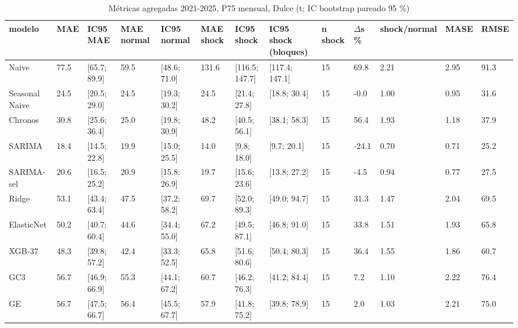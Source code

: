 \begin{table}[H]
\centering
\small
\caption{Métricas agregadas 2021-2025, P75 mensual, Dulce (t; IC bootstrap pareado 95 \%)}
\label{tab:T06_agregadas_P75_principal_2021_2025_dulce}
\begin{tabular}{lllllllllllll}
\toprule
modelo & MAE & IC95 MAE & MAE normal & IC95 normal & MAE shock & IC95 shock & IC95 shock (bloques) & n shock & $\Delta$s \% & shock/normal & MASE & RMSE \\
\midrule
Naive & 77.5 & [65.7; 89.9] & 59.5 & [48.6; 71.0] & 131.6 & [116.5; 147.7] & [117.4; 147.1] & 15 & 69.8 & 2.21 & 2.95 & 91.3 \\
Seasonal Naive & 24.5 & [20.5; 29.0] & 24.5 & [19.3; 30.2] & 24.5 & [21.4; 27.8] & [18.8; 30.4] & 15 & -0.0 & 1.00 & 0.95 & 31.6 \\
Chronos & 30.8 & [25.6; 36.4] & 25.0 & [19.8; 30.9] & 48.2 & [40.5; 56.1] & [38.1; 58.3] & 15 & 56.4 & 1.93 & 1.18 & 37.9 \\
SARIMA & 18.4 & [14.5; 22.8] & 19.9 & [15.0; 25.5] & 14.0 & [9.8; 18.0] & [9.7; 20.1] & 15 & -24.1 & 0.70 & 0.71 & 25.2 \\
SARIMA-sel & 20.6 & [16.5; 25.2] & 20.9 & [15.8; 26.9] & 19.7 & [15.6; 23.6] & [13.8; 27.2] & 15 & -4.5 & 0.94 & 0.77 & 27.5 \\
Ridge & 53.1 & [43.4; 63.4] & 47.5 & [37.2; 58.2] & 69.7 & [52.0; 89.3] & [49.0; 94.7] & 15 & 31.3 & 1.47 & 2.04 & 69.5 \\
ElasticNet & 50.2 & [40.7; 60.4] & 44.6 & [34.4; 55.0] & 67.2 & [49.5; 87.1] & [46.8; 91.0] & 15 & 33.8 & 1.51 & 1.93 & 65.8 \\
XGB-37 & 48.3 & [39.8; 57.2] & 42.4 & [33.3; 52.5] & 65.8 & [51.6; 80.6] & [50.4; 80.3] & 15 & 36.4 & 1.55 & 1.86 & 60.7 \\
GC3 & 56.7 & [46.9; 66.9] & 55.3 & [44.1; 67.2] & 60.7 & [46.2; 76.3] & [41.2; 84.4] & 15 & 7.2 & 1.10 & 2.22 & 76.4 \\
GE & 56.7 & [47.5; 66.7] & 56.4 & [45.5; 67.7] & 57.9 & [41.8; 75.2] & [39.8; 78.9] & 15 & 2.0 & 1.03 & 2.21 & 75.0 \\
\bottomrule
\end{tabular}
\end{table}